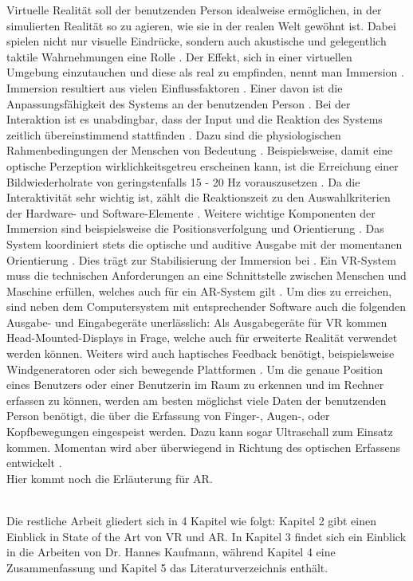 \documentclass[deutsch]{llncs}
\begin{document}
\noindent
Virtuelle Realität soll der benutzenden Person idealweise ermöglichen, in der simulierten Realität so zu agieren, wie sie in der realen Welt gewöhnt ist\cite{vr}. Dabei spielen nicht nur visuelle Eindrücke, sondern auch akustische und gelegentlich taktile Wahrnehmungen eine Rolle \cite{vr}. Der Effekt, sich in einer virtuellen Umgebung einzutauchen und diese als real zu empfinden, nennt man Immersion \cite{vr}. Immersion resultiert aus vielen Einflussfaktoren \cite{vr}. Einer davon ist die Anpassungsfähigkeit des Systems an der benutzenden Person \cite{vr}. Bei der Interaktion ist es unabdingbar, dass der Input und die Reaktion des Systems zeitlich übereinstimmend stattfinden \cite{vr}. Dazu sind die physiologischen Rahmenbedingungen der Menschen von Bedeutung \cite{vr}. Beispielsweise, damit eine optische Perzeption wirklichkeitsgetreu erscheinen kann, ist die Erreichung einer Bildwiederholrate von geringstenfalls 15 - 20 Hz vorauszusetzen \cite{vr}. Da die Interaktivität sehr wichtig ist, zählt die Reaktionszeit zu den Auswahlkriterien der Hardware- und Software-Elemente \cite{vr}. Weitere wichtige Komponenten der Immersion sind beispielsweise die Positionsverfolgung und Orientierung \cite{vr}. Das System koordiniert stets die optische und auditive Ausgabe mit der momentanen Orientierung \cite{vr}. Dies trägt zur Stabilisierung der Immersion bei \cite{vr}.
Ein VR-System muss die technischen Anforderungen an eine Schnittstelle zwischen Menschen und Maschine erfüllen, welches auch für ein AR-System gilt \cite{Klampfer}. Um dies zu erreichen, sind neben dem Computersystem mit entsprechender Software auch die folgenden Ausgabe- und Eingabegeräte unerlässlich: 
Als Ausgabegeräte für VR kommen Head-Mounted-Displays in Frage, welche auch für erweiterte Realität verwendet werden können. Weiters wird auch haptisches Feedback benötigt, beispielsweise Windgeneratoren oder sich bewegende Plattformen \cite{Klampfer}. 
Um die genaue Position eines Benutzers oder einer Benutzerin im Raum zu erkennen und im Rechner erfassen zu können, werden am besten möglichst viele Daten der benutzenden Person benötigt, die über die Erfassung von Finger-, Augen-, oder Kopfbewegungen eingespeist werden\cite{Klampfer}. Dazu kann sogar Ultraschall zum Einsatz kommen\cite{Klampfer}. Momentan wird aber überwiegend in Richtung des optischen Erfassens entwickelt \cite{Klampfer}.\\


Hier kommt noch die Erläuterung für AR.


\noindent \\
Die restliche Arbeit gliedert sich in 4 Kapitel wie folgt: 
Kapitel 2 gibt einen Einblick in State of the Art von VR und AR. In Kapitel 3 findet sich ein Einblick in die Arbeiten von Dr. Hannes Kaufmann, während Kapitel 4 eine Zusammenfassung und Kapitel 5 das Literaturverzeichnis enthält.
\end{document}
